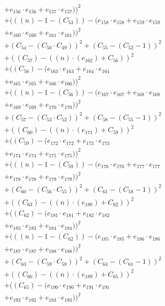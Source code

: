 \documentclass[10pt, a4paper]{article}
\begin{document}
\begin{align*}
& + e_{156} \cdot e_{156} + e_{157} \cdot e_{157}))^{2} \\
& + (((n) - 1 - (C_{53})) - (e_{158} \cdot e_{158} + e_{159} \cdot e_{159} \\
& + e_{160} \cdot e_{160} + e_{161} \cdot e_{161}))^{2} \\
& + (C_{54} - (C_{50}  \cdot  C_{49}))^{2} + (C_{55} - (C_{52} - 1))^{2} \\
& + ((C_{57}) - ((n)  \cdot  (e_{162}) + C_{56}))^{2} \\
& + ((C_{56}) - (e_{163} \cdot e_{163} + e_{164} \cdot e_{164} \\
& + e_{165} \cdot e_{165} + e_{166} \cdot e_{166}))^{2} \\
& + (((n) - 1 - (C_{56})) - (e_{167} \cdot e_{167} + e_{168} \cdot e_{168} \\
& + e_{169} \cdot e_{169} + e_{170} \cdot e_{170}))^{2} \\
& + (C_{57} - (C_{53}  \cdot  C_{52}))^{2} + (C_{58} - (C_{55} - 1))^{2} \\
& + ((C_{60}) - ((n)  \cdot  (e_{171}) + C_{59}))^{2} \\
& + ((C_{59}) - (e_{172} \cdot e_{172} + e_{173} \cdot e_{173} \\
& + e_{174} \cdot e_{174} + e_{175} \cdot e_{175}))^{2} \\
& + (((n) - 1 - (C_{59})) - (e_{176} \cdot e_{176} + e_{177} \cdot e_{177} \\
& + e_{178} \cdot e_{178} + e_{179} \cdot e_{179}))^{2} \\
& + (C_{60} - (C_{56}  \cdot  C_{55}))^{2} + (C_{61} - (C_{58} - 1))^{2} \\
& + ((C_{63}) - ((n)  \cdot  (e_{180}) + C_{62}))^{2} \\
& + ((C_{62}) - (e_{181} \cdot e_{181} + e_{182} \cdot e_{182} \\
& + e_{183} \cdot e_{183} + e_{184} \cdot e_{184}))^{2} \\
& + (((n) - 1 - (C_{62})) - (e_{185} \cdot e_{185} + e_{186} \cdot e_{186} \\
& + e_{187} \cdot e_{187} + e_{188} \cdot e_{188}))^{2} \\
& + (C_{63} - (C_{59}  \cdot  C_{58}))^{2} + (C_{64} - (C_{61} - 1))^{2} \\
& + ((C_{66}) - ((n)  \cdot  (e_{189}) + C_{65}))^{2} \\
& + ((C_{65}) - (e_{190} \cdot e_{190} + e_{191} \cdot e_{191} \\
& + e_{192} \cdot e_{192} + e_{193} \cdot e_{193}))^{2} \\

\end{align*}
\end{document}
